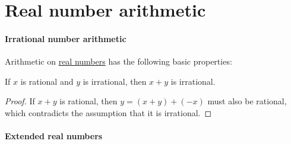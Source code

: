 \section{Real number arithmetic}\label{sec:real_number_arithmetic}

\paragraph{Irrational number arithmetic}

\begin{proposition}\label{thm:real_number_arithmetic}
  Arithmetic on \hyperref[def:real_numbers]{real numbers} has the following basic properties:
  \begin{thmenum}
     If \( x \) is rational and \( y \) is irrational, then \( x + y \) is irrational.
  \end{thmenum}
\end{proposition}
\begin{proof}
   If \( x + y \) is rational, then \( y = (x + y) + (-x) \) must also be rational, which contradicts the assumption that it is irrational.
\end{proof}

\paragraph{Extended real numbers}

